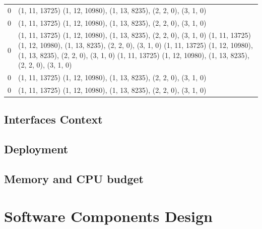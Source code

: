 \documentclass[9pt,twoside,openright,a4paper,pagesize]{report}
\begin{document}
\begin{longtable}{l | p{10cm}}
  0 & (1, 11, 13725) (1, 12, 10980), (1, 13, 8235), (2, 2, 0), (3, 1, 0) \\
  0 & (1, 11, 13725) (1, 12, 10980), (1, 13, 8235), (2, 2, 0), (3, 1, 0) \\
  0 & (1, 11, 13725) (1, 12, 10980), (1, 13, 8235), (2, 2, 0), (3, 1, 0) (1, 11, 13725) (1, 12, 10980), (1, 13, 8235), (2, 2, 0), (3, 1, 0) (1, 11, 13725) (1, 12, 10980), (1, 13, 8235), (2, 2, 0), (3, 1, 0) (1, 11, 13725) (1, 12, 10980), (1, 13, 8235), (2, 2, 0), (3, 1, 0) \\
  0 & (1, 11, 13725) (1, 12, 10980), (1, 13, 8235), (2, 2, 0), (3, 1, 0) \\
  0 & (1, 11, 13725) (1, 12, 10980), (1, 13, 8235), (2, 2, 0), (3, 1, 0) \\    
\end{longtable}
  
\section{Interfaces Context}
\section{Deployment}
\section{Memory and CPU budget}

\chapter{Software Components Design}
\label{chap:scd}
\end{document}
